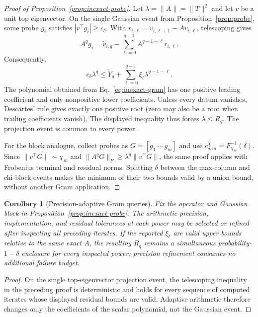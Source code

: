 \documentclass{article}
\newtheorem{corollary}{Corollary}
\begin{document}
\begin{proof}[Proof of Proposition~\ref{prop:inexact-probe}]
Let $\lambda=\|A\|=\|T\|^2$ and let $v$ be a unit top eigenvector.  On the
single Gaussian event from Proposition~\ref{prop:probe}, some probe $g_i$
satisfies $|v^\top g_i|\ge c_\delta$.  With
$r_{i,\ell}=\widetilde v_{i,\ell+1}-A\widetilde v_{i,\ell}$, telescoping gives
\begin{equation}
A^qg_i=\widetilde v_{i,q}
-\sum_{\ell=0}^{q-1}A^{q-1-\ell}r_{i,\ell}.
\end{equation}
Consequently,
\begin{equation}
c_\delta\lambda^q\le \widetilde Y_q+
\sum_{\ell=0}^{q-1}\xi_\ell\lambda^{q-1-\ell}.
\end{equation}
The polynomial obtained from Eq.~\eqref{eq:inexact-gram} has one positive
leading coefficient and only nonpositive lower coefficients.  Unless every
datum vanishes, Descartes' rule gives exactly one positive root (zero may also
be a root when trailing coefficients vanish).  The displayed inequality thus
forces $\lambda\le R_q$.  The projection event is common to every power.

For the block analogue, collect probes as $G=[g_1\ \cdots\ g_m]$ and use
$c^\chi_{\delta,m}=F^{-1}_{\chi_m}(\delta)$.  Since
$\|v^\top G\|\sim\chi_m$ and
$\|A^qG\|_F\ge\lambda^q\|v^\top G\|$, the same proof applies with
Frobenius terminal and residual norms.  Splitting $\delta$ between the
max-column and chi-block events makes the minimum of their two bounds valid by
a union bound, without another Gram application.
\end{proof}

\begin{corollary}[Precision-adaptive Gram queries]
\label{cor:precision-adaptive}
Fix the operator and Gaussian block in Proposition~\ref{prop:inexact-probe}.
The arithmetic precision, implementation, and residual tolerances at each power
may be selected or refined after inspecting all preceding iterates.  If the
reported $\xi_\ell$ are valid upper bounds relative to the same exact $A$, the
resulting $R_q$ remains a simultaneous probability-$1-\delta$ enclosure for
every inspected power; precision refinement consumes no additional failure
budget.
\end{corollary}

\begin{proof}
On the single top-eigenvector projection event, the telescoping inequality in
the preceding proof is deterministic and holds for every sequence of computed
iterates whose displayed residual bounds are valid.  Adaptive arithmetic
therefore changes only the coefficients of the scalar polynomial, not the
Gaussian event.
\end{proof}
\end{document}
